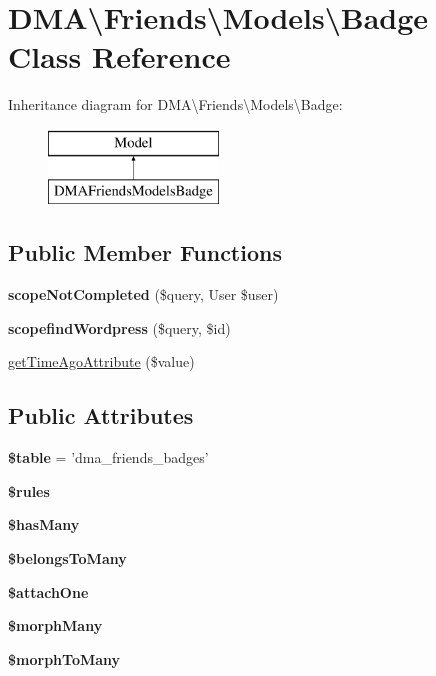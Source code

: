 \hypertarget{classDMA_1_1Friends_1_1Models_1_1Badge}{\section{D\-M\-A\textbackslash{}Friends\textbackslash{}Models\textbackslash{}Badge Class Reference}
\label{classDMA_1_1Friends_1_1Models_1_1Badge}
}
Inheritance diagram for D\-M\-A\textbackslash{}Friends\textbackslash{}Models\textbackslash{}Badge\-:\begin{figure}[H]
\begin{center}
\leavevmode
\includegraphics[height=2.000000cm]{df/d98/classDMA_1_1Friends_1_1Models_1_1Badge}
\end{center}
\end{figure}
\subsection*{Public Member Functions}
\begin{DoxyCompactItemize}
\item 
\hypertarget{classDMA_1_1Friends_1_1Models_1_1Badge_a65fc600bfefbedc8d7393ec86c848a51}{{\bfseries scope\-Not\-Completed} (\$query, User \$user)}\label{classDMA_1_1Friends_1_1Models_1_1Badge_a65fc600bfefbedc8d7393ec86c848a51}

\item 
\hypertarget{classDMA_1_1Friends_1_1Models_1_1Badge_a5ebdc91135362ca2b0225fdb0c965127}{{\bfseries scopefind\-Wordpress} (\$query, \$id)}\label{classDMA_1_1Friends_1_1Models_1_1Badge_a5ebdc91135362ca2b0225fdb0c965127}

\item 
\hyperlink{classDMA_1_1Friends_1_1Models_1_1Badge_a628b0da2969e586837ad98fecf12ee71}{get\-Time\-Ago\-Attribute} (\$value)
\end{DoxyCompactItemize}
\subsection*{Public Attributes}
\begin{DoxyCompactItemize}
\item 
\hypertarget{classDMA_1_1Friends_1_1Models_1_1Badge_aa58560300753d15561b1a979aa21b8fd}{{\bfseries \$table} = 'dma\-\_\-friends\-\_\-badges'}\label{classDMA_1_1Friends_1_1Models_1_1Badge_aa58560300753d15561b1a979aa21b8fd}

\item 
{\bfseries \$rules}
\item 
{\bfseries \$has\-Many}
\item 
{\bfseries \$belongs\-To\-Many}
\item 
{\bfseries \$attach\-One}
\item 
{\bfseries \$morph\-Many}
\item 
{\bfseries \$morph\-To\-Many}
\end{DoxyCompactItemize}
